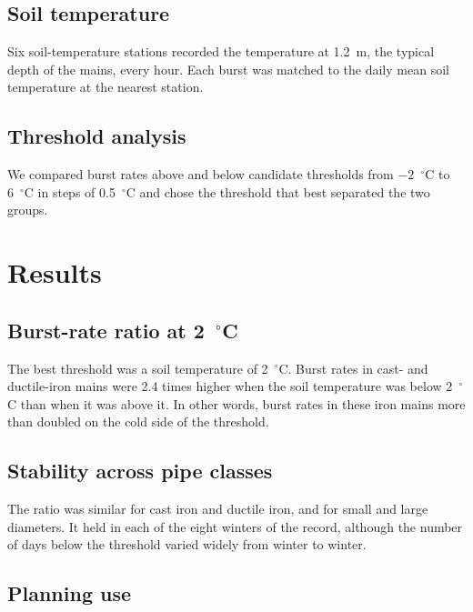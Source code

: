\documentclass{article}
\begin{document}
\subsection{Soil temperature}
\label{sec:method-soil}

Six soil-temperature stations recorded the temperature at 1.2~m, the typical
depth of the mains, every hour. Each burst was matched to the daily mean soil
temperature at the nearest station.

\subsection{Threshold analysis}
\label{sec:method-threshold}

We compared burst rates above and below candidate thresholds from
$-2$~$^\circ$C to 6~$^\circ$C in steps of 0.5~$^\circ$C and chose the threshold
that best separated the two groups.

\section{Results}
\label{sec:results}

\subsection{Burst-rate ratio at 2~$^\circ$C}
\label{sec:results-ratio}

The best threshold was a soil temperature of 2~$^\circ$C. Burst rates in cast-
and ductile-iron mains were 2.4 times higher when the soil temperature was
below 2~$^\circ$C than when it was above it. In other words, burst rates in
these iron mains more than doubled on the cold side of the threshold.

\subsection{Stability across pipe classes}
\label{sec:results-classes}

The ratio was similar for cast iron and ductile iron, and for small and large
diameters. It held in each of the eight winters of the record, although the
number of days below the threshold varied widely from winter to winter.

\subsection{Planning use}
\label{sec:results-planning}
\end{document}
